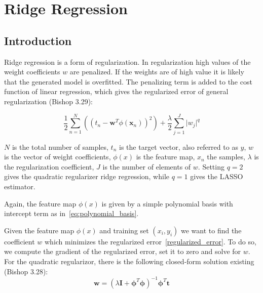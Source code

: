 
\section{Ridge Regression}
\subsection{Introduction}
Ridge regression is a form of regularization. In regularization high values of the weight coefficients $w$ are penalized. If the weights are of high value it is likely that the generated model is overfitted. The penalizing term is added to the cost function of linear regression, which gives the regularized error of general regularization (Bishop 3.29):
 
\begin{equation}
\frac{1}{2} \sum_{n=1}^{N}((t_n - \bm w^T \phi(\bm x_n))^2)
+ \frac{\lambda}{2} \sum_{j=1}^{J} \lvert{w_j}\rvert^q
\label{regularized_error}
\end{equation}

$N$ is the total number of samples, $t_n$ is the target vector, also referred to as $y$, $w$ is the vector of weight coefficients, $\phi(x)$ is the feature map, $x_n$ the samples, $\lambda$ is the regularization coefficient, $J$ is the number of elements of $w$. Setting $q = 2$ gives the quadratic regularizer ridge regression, while $q = 1$ gives the LASSO estimator.

Again, the feature map $\phi(x)$ is given by a simple polynomial basis with intercept term as in~\cref{eq:polynomial_basis}.

Given the feature map $\phi(x)$ and training set $(x_i, y_i)$ we want to find the coefficient $w$ which minimizes the regularized error~\cref{regularized_error}. To do so, we compute the gradient of the regularized error, set it to zero and solve for $w$. For the quadratic regularizor, there is the following closed-form solution existing (Bishop 3.28):
\begin{equation}
\bm w = (\lambda\bm I + \bm\phi^T\bm\phi)^{-1} \bm \phi^T \bm t 
\label{eq:weights_quad}
\end{equation}

